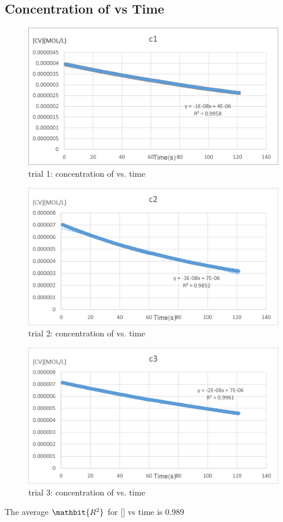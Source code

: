 \documentclass{article}
\begin{document}
\subsection{Concentration of  vs Time}
\begin{figure}[H] 
\centering
\includegraphics[scale=0.9]{c1.png}
\caption{trial 1: concentration of  vs. time}
\end{figure}
\begin{figure}[H] 
\centering
\includegraphics[scale=0.9]{c2.png}
\caption{trial 2: concentration of  vs. time}
\end{figure}
\begin{figure}[H] 
\centering
\includegraphics[scale=0.9]{c3.png}
\caption{trial 3: concentration of  vs. time}
\end{figure}
The average $\mathbit{R^2}$ for [] vs time is 0.989
\end{document}
